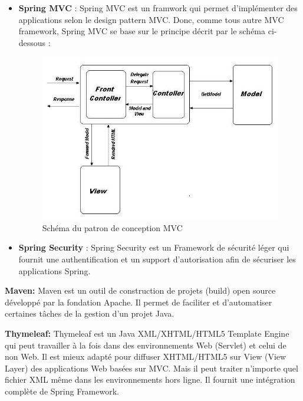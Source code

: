 \documentclass[12pt]{article}
\begin{document}
\begin{itemize}
	\item \textbf{Spring MVC} : Spring MVC est un framwork qui permet d’implémenter des applications selon le design pattern MVC. Donc, comme tous autre MVC framework, Spring MVC se base sur le principe décrit par le schéma ci-dessous :\newline
	

\begin{figure}[H]
	\centering
 		\includegraphics[width=1\textwidth]{diagrammes/mvc.jpg} 
  		\caption{Schéma du patron de conception MVC}
	\end{figure}
	
	\item \textbf{Spring Security }: Spring Security est un Framework de sécurité léger qui fournit une authentification et un support d’autorisation afin de sécuriser les applications Spring.\newline
\end{itemize} 

\textbf{Maven:} Maven est un outil de construction de projets (build) open source développé par la fondation Apache. Il permet de faciliter et d'automatiser certaines tâches de la gestion d'un projet Java.\newline

\textbf{Thymeleaf:} Thymeleaf est un  Java XML/XHTML/HTML5 Template Engine qui peut travailler à la fois dans des environnements Web (Servlet) et celui de non Web. Il est mieux adapté pour diffuser XHTML/HTML5 sur View (View Layer) des applications Web basées sur MVC. Mais il peut traiter n'importe quel fichier XML même dans les environnements hors ligne. Il fournit une intégration complète de Spring Framework. 
\end{document}
